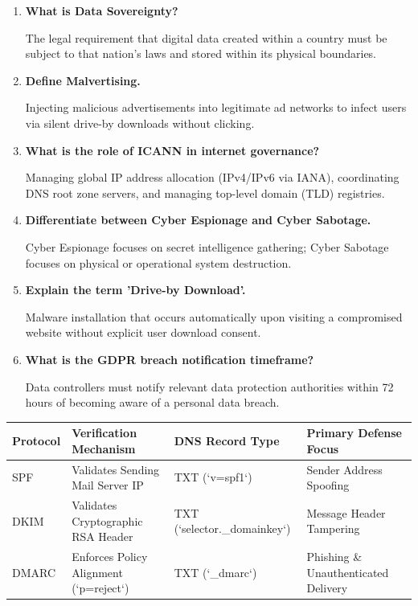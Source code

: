 \documentclass[12pt,a4paper]{article}
\newcommand{\Q}[1]{\textbf{#1}\par\noindent\ignorespaces}
\renewcommand{\arraystretch}{1.45}
\begin{document}
\begin{tcolorbox}[exambox, title={\textbf{Frequently Asked / Viva Questions}}]
\begin{enumerate}[leftmargin=*, label=\textbf{Q\arabic*.}, itemsep=5pt, topsep=0pt]
  \item \Q{What is Data Sovereignty?}
        The legal requirement that digital data created within a country must be subject to that nation's laws and stored within its physical boundaries.

  \item \Q{Define Malvertising.}
        Injecting malicious advertisements into legitimate ad networks to infect users via silent drive-by downloads without clicking.

  \item \Q{What is the role of ICANN in internet governance?}
        Managing global IP address allocation (IPv4/IPv6 via IANA), coordinating DNS root zone servers, and managing top-level domain (TLD) registries.

  \item \Q{Differentiate between Cyber Espionage and Cyber Sabotage.}
        Cyber Espionage focuses on secret intelligence gathering; Cyber Sabotage focuses on physical or operational system destruction.

  \item \Q{Explain the term 'Drive-by Download'.}
        Malware installation that occurs automatically upon visiting a compromised website without explicit user download consent.

  \item \Q{What is the GDPR breach notification timeframe?}
        Data controllers must notify relevant data protection authorities within 72 hours of becoming aware of a personal data breach.
\end{enumerate}
\end{tcolorbox}

\begin{tcolorbox}[tikzbox, title={Summary Comparison: Email Authentication Protocols}]
\centering
{\renewcommand{\arraystretch}{1.45}%
\begin{tabularx}{\linewidth}{|B{2.2cm}|Y|B{3.8cm}|Y|}
\hline
\textbf{Protocol} & \textbf{Verification Mechanism} & \textbf{DNS Record Type} & \textbf{Primary Defense Focus} \\
\hline
SPF & Validates Sending Mail Server IP & TXT (`v=spf1`) & Sender Address Spoofing \\
\hline
DKIM & Validates Cryptographic RSA Header & TXT (`selector.\_domainkey`) & Message Header Tampering \\
\hline
DMARC & Enforces Policy Alignment (`p=reject`) & TXT (`\_dmarc`) & Phishing \& Unauthenticated Delivery \\
\hline
\end{tabularx}}
\end{tcolorbox}
\end{document}
